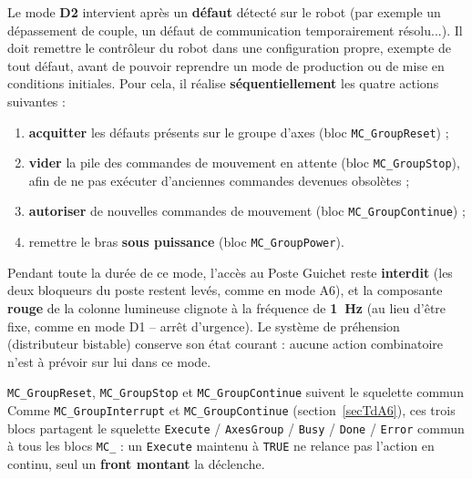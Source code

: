 Le mode \textbf{D2} intervient après un \textbf{défaut} détecté sur le
robot (par exemple un dépassement de couple, un défaut de communication
temporairement résolu...). Il doit remettre le contrôleur du robot dans
une configuration propre, exempte de tout défaut, avant de pouvoir
reprendre un mode de production ou de mise en conditions initiales. Pour
cela, il réalise \textbf{séquentiellement} les quatre actions suivantes :

\begin{enumerate}
    \item \textbf{acquitter} les défauts présents sur le groupe d'axes
    (bloc \texttt{MC\_GroupReset}) ;
    \item \textbf{vider} la pile des commandes de mouvement en attente
    (bloc \texttt{MC\_GroupStop}), afin de ne pas exécuter d'anciennes
    commandes devenues obsolètes ;
    \item \textbf{autoriser} de nouvelles commandes de mouvement (bloc
    \texttt{MC\_GroupContinue}) ;
    \item remettre le bras \textbf{sous puissance} (bloc
    \texttt{MC\_GroupPower}).
\end{enumerate}

Pendant toute la durée de ce mode, l'accès au Poste Guichet reste
\textbf{interdit} (les deux bloqueurs du poste restent levés, comme en
mode A6), et la composante \textbf{rouge} de la colonne lumineuse
clignote à la fréquence de \textbf{1~Hz} (au lieu d'être fixe, comme en
mode D1 -- arrêt d'urgence). Le système de préhension (distributeur
bistable) conserve son état courant : aucune action combinatoire n'est à
prévoir sur lui dans ce mode.

\begin{UPSTIwarning}{\texttt{MC\_GroupReset}, \texttt{MC\_GroupStop} et \texttt{MC\_GroupContinue} suivent le squelette commun}
Comme \texttt{MC\_GroupInterrupt} et \texttt{MC\_GroupContinue}
(section~\ref{secTdA6}), ces trois blocs partagent le squelette
\texttt{Execute} / \texttt{AxesGroup} / \texttt{Busy} / \texttt{Done} /
\texttt{Error} commun à tous les blocs \texttt{MC\_} : un \texttt{Execute}
maintenu à \texttt{TRUE} ne relance pas l'action en continu, seul un
\textbf{front montant} la déclenche.
\end{UPSTIwarning}


